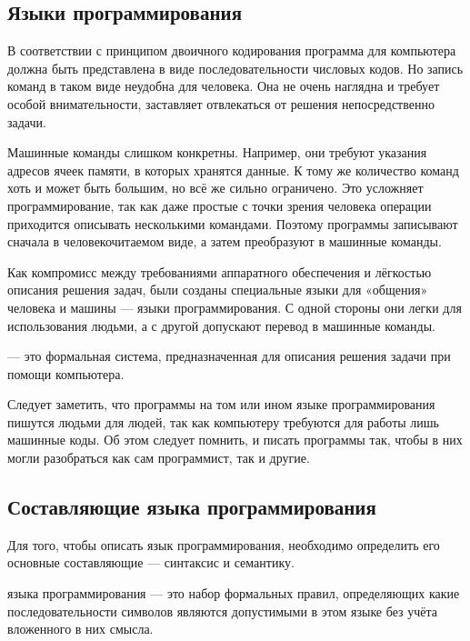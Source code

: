 \subsection{Языки программирования}

В соответствии с принципом двоичного кодирования программа для
компьютера должна быть представлена в виде последовательности числовых
кодов. Но запись команд в таком виде неудобна для человека. Она не
очень наглядна и требует особой внимательности, заставляет отвлекаться
от решения непосредственно задачи.

Машинные команды слишком конкретны. Например, они требуют указания
адресов ячеек памяти, в которых хранятся данные. К тому же количество
команд хоть и может быть большим, но всё же сильно ограничено. Это
усложняет программирование, так как даже простые с точки зрения
человека операции приходится описывать несколькими командами. Поэтому
программы записывают сначала в человекочитаемом виде, а затем
преобразуют в машинные команды.

Как компромисс между требованиями аппаратного обеспечения и лёгкостью
описания решения задач, были созданы специальные языки для «общения»
человека и машины — языки программирования. С одной стороны они легки
для использования людьми, а с другой допускают перевод в машинные
команды.

\begin{defn}
   — это формальная
  система, предназначенная для описания решения задачи при помощи
  компьютера.
\end{defn}

Следует заметить, что программы на том или ином языке программирования
пишутся людьми для людей, так как компьютеру требуются для работы лишь
машинные коды. Об этом следует помнить, и писать программы так, чтобы
в них могли разобраться как сам программист, так и другие.

\subsection{Составляющие языка программирования}

Для того, чтобы описать язык программирования, необходимо определить
его основные составляющие — синтаксис и семантику.

\begin{defn}
   языка программирования — это набор
  формальных правил, определяющих какие последовательности символов
  являются допустимыми в этом языке без учёта вложенного в них смысла.
\end{defn}

